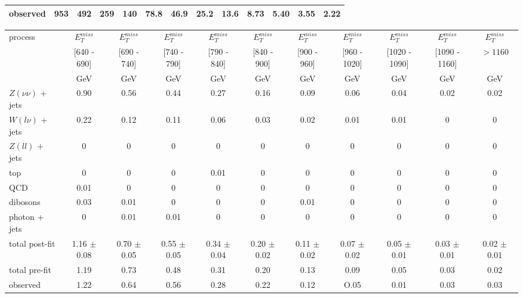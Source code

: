\begin{landscape}
\begin{table}[p]
\begin{subtable}{}
\begin{tabular}{| l | c | c | c | c | c | c | c | c | c | c | c | c |}
\hline
\hline
  observed & 953 & 492 & 259 & 140 & 78.8 & 46.9 & 25.2 & 13.6 & 8.73 & 5.40 & 3.55 & 2.22\\
\hline
\end{tabular}
\end{subtable}
\vspace*{.7cm}
\begin{subtable}{}
\renewcommand{\arraystretch}{1.3}
\begin{tabular}{| l | c | c | c | c | c | c | c | c | c | c |}
\hline
\multirow{3}{*}{process} &  $E_T^{miss}$ &  $E_T^{miss}$ &  $E_T^{miss}$ &  $E_T^{miss}$ &  $E_T^{miss}$ &  $E_T^{miss}$ &  $E_T^{miss}$ &  $E_T^{miss}$ &  $E_T^{miss}$ &  $E_T^{miss}$  \\
 & [640 - 690] & [690 - 740] & [740 - 790] & [790 - 840] & [840 - 900] & [900 - 960] & [960 - 1020] & [1020 - 1090] & [1090 - 1160] & $> 1160$  \\
 & GeV & GeV & GeV & GeV & GeV & GeV & GeV & GeV & GeV & GeV \\
\hline
  $Z(\nu\nu)$ + jets & 0.90 & 0.56 & 0.44 & 0.27 & 0.16 & 0.09 & 0.06 & 0.04 & 0.02 & 0.02\\
  $W(l\nu)$ + jets & 0.22 & 0.12 & 0.11 & 0.06 & 0.03 & 0.02 & 0.01 & 0.01 & 0 & 0\\
  $Z(ll)$ + jets & 0 & 0 & 0 & 0 & 0 & 0 & 0 & 0 & 0 & 0\\
  top & 0 & 0 & 0 & 0.01 & 0 & 0 & 0 & 0 & 0 & 0\\
  QCD & 0.01 & 0 & 0 & 0 & 0 & 0 & 0 & 0 & 0 & 0\\
  dibosons & 0.03 & 0.01 & 0 & 0 & 0 & 0.01 & 0 & 0 & 0 & 0\\
  photon + jets  & 0 & 0.01 & 0.01 & 0 & 0 & 0 & 0 & 0 & 0 & 0\\
\hline
  total post-fit & 1.16 $\pm$ 0.08 & 0.70 $\pm$ 0.05 & 0.55 $\pm$ 0.05 & 0.34 $\pm$ 0.04 & 0.20 $\pm$ 0.02 & 0.11 $\pm$ 0.02 & 0.07 $\pm$ 0.02 & 0.05 $\pm$ 0.01 & 0.03 $\pm$ 0.01 & 0.02 $\pm$ 0.01\\
\hline
  total pre-fit  & 1.19 & 0.73 & 0.48 & 0.31 & 0.20 & 0.13 & 0.09 & 0.05 & 0.03 & 0.02\\
\hline
\hline
  observed & 1.22 & 0.64 & 0.56 & 0.28 & 0.22 & 0.12 & O.05 & 0.01 & 0.03 & 0.03 \\
\hline
\end{tabular}
\end{subtable}
\end{table}

\end{landscape}

